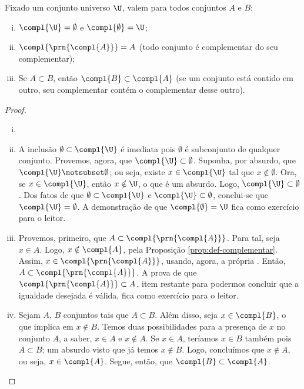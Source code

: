 \begin{proposition}
\label{prop:complementar}
Fixado um conjunto universo $\U$, valem para todos conjuntos $A$ e $B$:
\begin{enumerate}[i)]
	\item
		\label{prop:complementar:universo}
		$\compl{\U}=\emptyset$ e $\compl{\emptyset} = \U$;
	\item
		\label{prop:complementar:complementar-do-complementar}
		$\compl{\prn{\compl{A}}} = A$ (todo conjunto é complementar do seu complementar);
	\item
		\label{prop:complementar:contrapositiva}
		Se $A \subset B$, então $\compl{B} \subset \compl{A}$ (se um conjunto está contido em outro, seu complementar contém o complementar desse outro). 
\end{enumerate}
\end{proposition}

\begin{proof}
\begin{enumerate}[i)]
\item[]
\item
A inclusão $\emptyset \subset \compl{\U}$ é imediata pois $\emptyset$ é subconjunto de qualquer conjunto. 
Provemos, agora, que $\compl{\U} \subset \emptyset$.
Suponha, por absurdo, que $\compl{\U} \notsubset \emptyset$; ou seja, existe $x \in \compl{\U}$ tal que $x \notin \emptyset$.
Ora, se $x \in \compl{\U}$, então $x \notin \U$, o que é um absurdo.
Logo, $\compl{\U} \subset \emptyset$.
Dos fatos de que $\emptyset \subset \compl{\U}$ e $\compl{\U} \subset \emptyset$, conclui-se que $\compl{\U} = \emptyset$.
A demonstração de que $\compl{\emptyset} = \U$ fica como exercício para o leitor.

\item
Provemos, primeiro, que $A \subset \compl{\prn{\compl{A}}}$.
Para tal, seja $x \in A$.
Logo, $x \notin \compl{A}$, pela Proposição \ref{prop:def-complementar}.
Assim, $x \in \compl{\prn{\compl{A}}}$, usando, agora, a própria .
Então, $A \subset \compl{\prn{\compl{A}}}$.
A prova de que $\compl{\prn{\compl{A}}} \subset A$, item restante para podermos concluir que a igualdade desejada é válida, fica como exercício para o leitor.

\item
Sejam $A$, $B$ conjuntos tais que $A \subset B$.
Além disso, seja $x \in \compl{B}$, o que implica em $x \notin B$.
Temos duas possibilidades para a presença de $x$ no conjunto $A$, a saber, $x \in A$ e $x \notin A$.
Se $x \in A$, teríamos $x \in B$ também pois $A \subset B$; um absurdo visto que já temos $x \notin B$.
Logo, concluímos que $x \notin A$, ou seja, $x \in \compl{A}$.
Segue, então, que $\compl{B} \subset \compl{A}$.
\end{enumerate}
\end{proof}